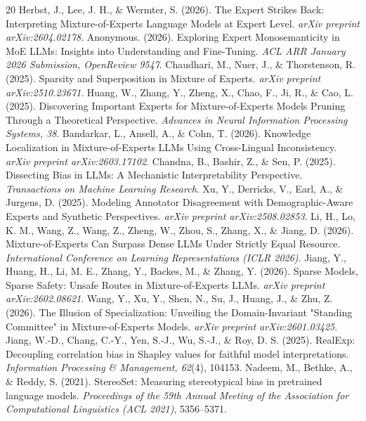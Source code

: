 \documentclass[11pt,a4paper]{article}
\begin{document}
\begin{thebibliography}{20}
 Herbst, J., Lee, J. H., \& Wermter, S. (2026). The Expert Strikes Back: Interpreting Mixture-of-Experts Language Models at Expert Level. \textit{arXiv preprint arXiv:2604.02178}.
 Anonymous. (2026). Exploring Expert Monosemanticity in MoE LLMs: Insights into Understanding and Fine-Tuning. \textit{ACL ARR January 2026 Submission, OpenReview 9547}.
 Chaudhari, M., Nuer, J., \& Thorstenson, R. (2025). Sparsity and Superposition in Mixture of Experts. \textit{arXiv preprint arXiv:2510.23671}.
 Huang, W., Zhang, Y., Zheng, X., Chao, F., Ji, R., \& Cao, L. (2025). Discovering Important Experts for Mixture-of-Experts Models Pruning Through a Theoretical Perspective. \textit{Advances in Neural Information Processing Systems, 38}.
 Bandarkar, L., Ansell, A., \& Cohn, T. (2026). Knowledge Localization in Mixture-of-Experts LLMs Using Cross-Lingual Inconsistency. \textit{arXiv preprint arXiv:2603.17102}.
 Chandna, B., Bashir, Z., \& Sen, P. (2025). Dissecting Bias in LLMs: A Mechanistic Interpretability Perspective. \textit{Transactions on Machine Learning Research}.
 Xu, Y., Derricks, V., Earl, A., \& Jurgens, D. (2025). Modeling Annotator Disagreement with Demographic-Aware Experts and Synthetic Perspectives. \textit{arXiv preprint arXiv:2508.02853}.
 Li, H., Lo, K. M., Wang, Z., Wang, Z., Zheng, W., Zhou, S., Zhang, X., \& Jiang, D. (2026). Mixture-of-Experts Can Surpass Dense LLMs Under Strictly Equal Resource. \textit{International Conference on Learning Representations (ICLR 2026)}.
 Jiang, Y., Huang, H., Li, M. E., Zhang, Y., Backes, M., \& Zhang, Y. (2026). Sparse Models, Sparse Safety: Unsafe Routes in Mixture-of-Experts LLMs. \textit{arXiv preprint arXiv:2602.08621}.
 Wang, Y., Xu, Y., Shen, N., Su, J., Huang, J., \& Zhu, Z. (2026). The Illusion of Specialization: Unveiling the Domain-Invariant "Standing Committee" in Mixture-of-Experts Models. \textit{arXiv preprint arXiv:2601.03425}.
 Jiang, W.-D., Chang, C.-Y., Yen, S.-J., Wu, S.-J., \& Roy, D. S. (2025). RealExp: Decoupling correlation bias in Shapley values for faithful model interpretations. \textit{Information Processing \& Management, 62}(4), 104153.
 Nadeem, M., Bethke, A., \& Reddy, S. (2021). StereoSet: Measuring stereotypical bias in pretrained language models. \textit{Proceedings of the 59th Annual Meeting of the Association for Computational Linguistics (ACL 2021)}, 5356--5371.

\end{thebibliography}
\end{document}
